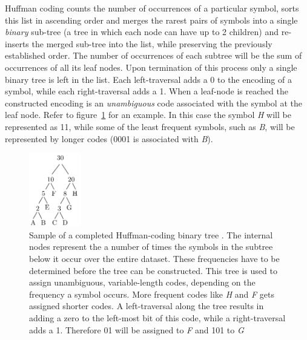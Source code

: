 Huffman coding counts the number of occurrences of a particular symbol, sorts this list in ascending order and merges the rarest pairs of symbols into a single \textit{binary} 
sub-tree (a tree in which each node can have up to 2 children) and re-inserts the merged sub-tree into the list, while preserving the previously established order. The number of occurrences 
of each subtree will be the sum of occurrences of all its leaf nodes. Upon termination of this process only a single binary tree is left in the list. Each left-traversal adds a 0 to the encoding 
of a symbol, while each right-traversal adds a 1. When a leaf-node is reached the constructed encoding is an \textit{unambiguous} code associated with the symbol at the leaf node. Refer to figure~\ref{HUFFMAN} for an example.
In this case the symbol \textit{H} will be represented as 11, while some of the least frequent symbols, such as \textit{B}, will be represented by longer codes (0001 is associated with \textit{B}).
\begin{figure}[h!]
\begin{mdframed}
 \centering
 \includegraphics[width=0.2\textwidth]{huffmanTree.png}
 \caption[Huffman coding illustration]{Sample of a completed Huffman-coding binary tree \cite[p. 70]{salomon2004data}. The internal nodes represent the a number of times the symbols in the subtree below it occur over the entire
 dataset. These frequencies have to be determined before the tree can be constructed. This tree is used to assign unambiguous, variable-length codes, depending on the frequency a symbol occurs.
 More frequent codes like \textit{H} and \textit{F} gets assigned shorter codes. A left-traversal along the tree results in adding a zero to the left-most bit of this code, while a right-traversal
 adds a 1. Therefore 01 will be assigned to \textit{F} and 101 to \textit{G}}
 \label{HUFFMAN}
\end{mdframed}
\end{figure}

